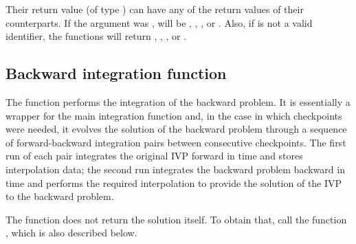 Their return value  (of type ) can have any of the return values 
of their counterparts.
If the  argument was , 
 will be , ,
, or .  
Also, if  is not a valid identifier, the functions will return 
, ,
, or . 


\subsection{Backward integration function}
\label{sss:cvsolveb}

The function  performs the integration of the backward problem.
It is essentially a wrapper for the {\cvodes} main integration function 
 and, in the case in which checkpoints were needed, it evolves 
the solution of the backward problem through a sequence of forward-backward 
integration pairs between consecutive checkpoints. 
The first run of each pair integrates the original IVP forward in time and
stores interpolation data; the second run integrates the backward problem 
backward in time and performs the required interpolation to provide
the solution of the IVP to the backward problem.

The function  does not return the solution  itself.
To obtain that, call the function , which is also
described below.

